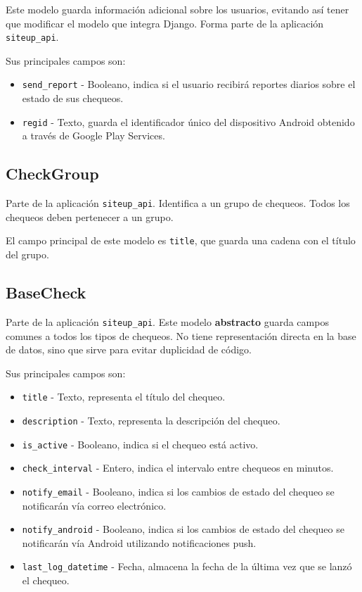 Este modelo guarda información adicional sobre los usuarios, evitando así tener
que modificar el modelo que integra Django. Forma parte de la aplicación \texttt{siteup\_api}.

Sus principales campos son:

\begin{itemize}
\item \texttt{send\_report} - Booleano, indica si el usuario recibirá reportes
  diarios sobre el estado de sus chequeos.
\item \texttt{regid} - Texto, guarda el identificador único del dispositivo
  Android obtenido a través de Google Play Services.
\end{itemize}

\subsection{CheckGroup}

Parte de la aplicación \texttt{siteup\_api}. Identifica a un grupo de
chequeos. Todos los chequeos deben pertenecer a un grupo. 

El campo principal de este modelo es \texttt{title}, que guarda una cadena con
el título del grupo.

\subsection{BaseCheck}

Parte de la aplicación \texttt{siteup\_api}. Este modelo \textbf{abstracto}
guarda campos comunes a todos los tipos de chequeos. No tiene representación
directa en la base de datos, sino que sirve para evitar duplicidad de código.

Sus principales campos son:

\begin{itemize}
\item \texttt{title} - Texto, representa el título del chequeo.
\item \texttt{description} - Texto, representa la descripción del chequeo.
\item \texttt{is\_active} - Booleano, indica si el chequeo está activo.
\item \texttt{check\_interval} - Entero, indica el intervalo entre chequeos en minutos.
\item \texttt{notify\_email} - Booleano, indica si los cambios de estado del
  chequeo se notificarán vía correo electrónico.
\item \texttt{notify\_android} - Booleano, indica si los cambios de estado del
  chequeo se notificarán vía Android utilizando notificaciones push.
\item \texttt{last\_log\_datetime} - Fecha, almacena la fecha de la última vez que se lanzó el chequeo.
\end{itemize}

